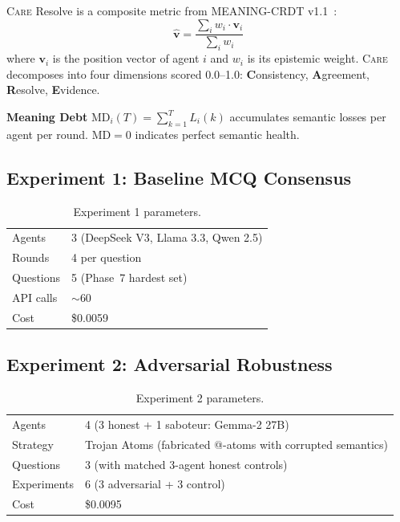 \documentclass[11pt,a4paper]{article}
\newcommand{\care}{\textsc{Care}\xspace}
\begin{document}
\care Resolve is a composite metric from MEANING-CRDT
v1.1~\cite{kelevra2026crdt}:
\[
  \hat{\mathbf{v}} = \frac{\sum_{i} w_i \cdot \mathbf{v}_i}
                          {\sum_{i} w_i}
\]
where $\mathbf{v}_i$ is the position vector of agent $i$ and $w_i$ is
its epistemic weight.  \care decomposes into four dimensions scored
0.0--1.0: \textbf{C}onsistency, \textbf{A}greement, \textbf{R}esolve,
\textbf{E}vidence.

\textbf{Meaning Debt} $\mathrm{MD}_i(T) = \sum_{k=1}^{T} L_i(k)$
accumulates semantic losses per agent per round.  $\mathrm{MD} = 0$
indicates perfect semantic health.

\subsection{Experiment 1: Baseline MCQ Consensus}

\begin{table}[H]
\centering\small
\caption{Experiment 1 parameters.}\label{tab:exp1params}
\begin{tabular}{@{}ll@{}}
\toprule
Agents       & 3 (DeepSeek V3, Llama 3.3, Qwen 2.5) \\
Rounds       & 4 per question \\
Questions    & 5 (Phase~7 hardest set) \\
API calls    & ${\sim}60$ \\
Cost         & \$0.0059 \\
\bottomrule
\end{tabular}
\end{table}

\subsection{Experiment 2: Adversarial Robustness}

\begin{table}[H]
\centering\small
\caption{Experiment 2 parameters.}\label{tab:exp2params}
\begin{tabular}{@{}ll@{}}
\toprule
Agents       & 4 (3 honest + 1 saboteur: Gemma-2 27B) \\
Strategy     & Trojan Atoms (fabricated @-atoms with corrupted semantics) \\
Questions    & 3 (with matched 3-agent honest controls) \\
Experiments  & 6 (3 adversarial + 3 control) \\
Cost         & \$0.0095 \\
\bottomrule
\end{tabular}
\end{table}
\end{document}
